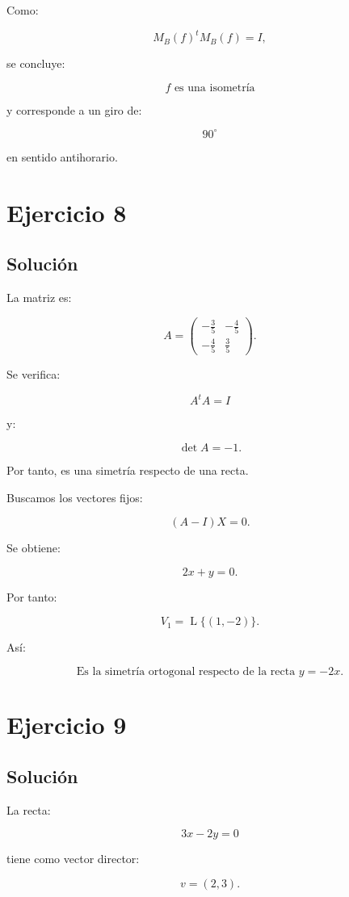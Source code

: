 \documentclass[11pt,a4paper]{article}
\newcommand{\Span}{\operatorname{L}}
\begin{document}
Como:

\[
M_B(f)^tM_B(f)=I,
\]

se concluye:

\[
\boxed{
f\text{ es una isometría}
}
\]

y corresponde a un giro de:

\[
\boxed{
90^\circ
}
\]

en sentido antihorario.

\section{Ejercicio 8}
\subsection{Solución}

La matriz es:

\[
A=
\begin{pmatrix}
-\frac35&-\frac45\\[1mm]
-\frac45&\frac35
\end{pmatrix}.
\]

Se verifica:

\[
A^tA=I
\]

y:

\[
\det A=-1.
\]

Por tanto, es una simetría respecto de una recta.

Buscamos los vectores fijos:

\[
(A-I)X=0.
\]

Se obtiene:

\[
2x+y=0.
\]

Por tanto:

\[
V_1
=
\Span\{(1,-2)\}.
\]

Así:

\[
\boxed{
\text{Es la simetría ortogonal respecto de la recta }y=-2x.
}
\]

\section{Ejercicio 9}
\subsection{Solución}

La recta:

\[
3x-2y=0
\]

tiene como vector director:

\[
v=(2,3).
\]
\end{document}
